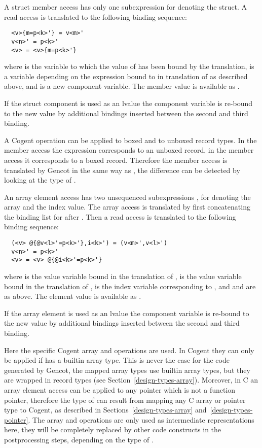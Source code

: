 A struct member access  has only one subexpression  for denoting the struct. A read access is translated to the
following binding sequence:
\begin{verbatim}
  <v>{m=p<k>'} = v<m>'
  v<n>' = p<k>'
  <v> = <v>{m=p<k>'}
\end{verbatim}
where  is the variable to which the value of  has been bound by the translation,  is a variable
depending on the expression bound to  in translation of  as described above, and 
is a new component variable. The member value is available as .

If the struct component is used as an lvalue the component variable  is re-bound to the new value by additional
bindings inserted between the second and third binding.

A Cogent  operation can be applied to boxed and to unboxed record types. In the member access  the expression
 corresponds to an unboxed record, in the member access  it corresponds to a boxed record. Therefore the
member access  is translated by Gencot in the same way as , the difference can be detected by looking at
the type of .

An array element access  has two unsequenced subexpressions ,  for denoting the array and the index value.
The array access is translated by first concatenating the binding list for  after . Then a read access is translated
to the following binding sequence:
\begin{verbatim}
  (<v> @{@v<l>'=p<k>'},i<k>') = (v<m>',v<l>')
  v<n>' = p<k>'
  <v> = <v> @{@i<k>'=p<k>'}
\end{verbatim}
where  is the value variable bound in the translation of ,  is the value variable bound in the translation
of ,  is the index variable corresponding to , and  and 
are as above. The element value is available as .

If the array element is used as an lvalue the component variable  is re-bound to the new value by additional
bindings inserted between the second and third binding.

Here the specific Cogent array  and  operations are used. In Cogent they can only be applied if 
has a builtin array type. This is never the case for the code generated by Gencot, the mapped array types use builtin array types,
but they are wrapped in record types (see Section~\ref{design-types-array}). Moreover, in C an array element access can be applied
to any pointer which is not a function pointer, therefore the type of  can result from mapping any C array or pointer
type to Cogent, as described in Sections~\ref{design-types-array} and~\ref{design-types-pointer}. The array  and 
operations are only used as intermediate representations here, they will be completely replaced by other code constructs in the
postprocessing steps, depending on the type of .

